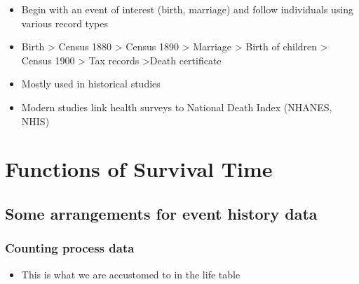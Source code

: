 \documentclass[
]{article}
\providecommand{\tightlist}{%
  \setlength{\itemsep}{0pt}\setlength{\parskip}{0pt}}
\begin{document}
\begin{itemize}
  \begin{itemize}
  \tightlist
  \item
    Begin with an event of interest (birth, marriage) and follow individuals using various record types
  \item
    Birth \textgreater{} Census 1880 \textgreater{} Census 1890 \textgreater{} Marriage \textgreater{} Birth of children \textgreater{} Census 1900 \textgreater{} Tax records \textgreater Death certificate
  \item
    Mostly used in historical studies
  \item
    Modern studies link health surveys to National Death Index (NHANES, NHIS)
  \end{itemize}
\end{itemize}

\hypertarget{functions-of-survival-time}{%
\section{Functions of Survival Time}\label{functions-of-survival-time}}

\hypertarget{some-arrangements-for-event-history-data}{%
\subsection{Some arrangements for event history data}\label{some-arrangements-for-event-history-data}}

\hypertarget{counting-process-data}{%
\subsubsection{Counting process data}\label{counting-process-data}}

\begin{itemize}
\tightlist
\item
  This is what we are accustomed to in the life table
\end{itemize}
\end{document}
